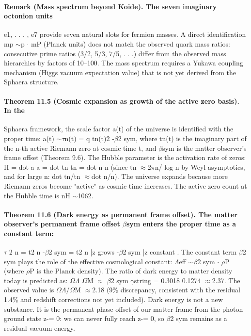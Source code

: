 \paragraph*{Remark (Mass spectrum beyond Koide). The seven imaginary octonion units}
e1, . . . , e7 provide seven natural slots for fermion masses. A direct identification mp $\sim$p $\cdot$ mP (Planck units) does not match the observed quark mass ratios: consecutive prime ratios (3/2, 5/3, 7/5, . . .) differ from the observed mass hierarchies by factors of 10--100. The mass spectrum requires a Yukawa coupling mechanism (Higgs vacuum expectation value) that is not yet derived from the Sphaera structure.
\paragraph*{Theorem 11.5 (Cosmic expansion as growth of the active zero basis). In the}
Sphaera framework, the scale factor a(t) of the universe is identified with the proper time: a(t) $\sim$$\tau$n(t) = q tn(t)2 -$\beta$2 sym, where tn(t) is the imaginary part of the n-th active Riemann zero at cosmic time t, and $\beta$sym is the matter observer's frame offset (Theorem 9.6). The Hubble parameter is the activation rate of zeros: H = dot a a = dot tn tn = dot n n (since tn $\approx$2$\pi$n/ log n by Weyl asymptotics, and for large n: dot tn/tn $\approx$dot n/n). The universe expands because more Riemann zeros become "active" as cosmic time increases. The active zero count at the Hubble time is nH $\sim$1062.
\paragraph*{Theorem 11.6 (Dark energy as permanent frame offset). The matter observer's permanent frame offset $\beta$sym enters the proper time as a constant term:}
$\tau$ 2 n = t2 n -$\beta$2 sym = t2 n |{z} grows -$\beta$2 sym |{z} constant . The constant term $\beta$2 sym plays the role of the effective cosmological constant: $\Lambda$eff $\sim$$\beta$2 sym $\cdot$ $\rho$P (where $\rho$P is the Planck density). The ratio of dark energy to matter density today is predicted as: $\Omega$$\Lambda$ $\Omega$M $\approx$ $\beta$2 sym $\gamma$string = 0.3018
0.1274 $\approx$2.37.
The observed value is $\Omega$$\Lambda$/$\Omega$M $\approx$2.18 (9\% discrepancy, consistent with the residual 1.4\% and redshift corrections not yet included).
Dark energy is not a new substance. It is the permanent phase offset of our matter frame from the photon ground state z-= 0: we can never fully reach z-= 0, so $\beta$2 sym remains as a residual vacuum energy.
